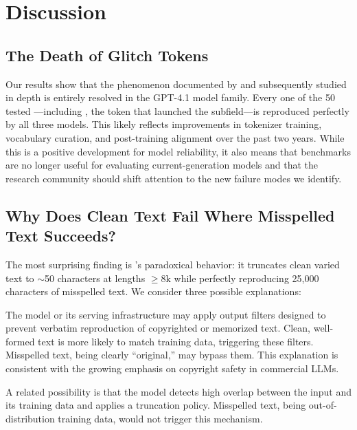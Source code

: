 \section{Discussion}
\label{sec:discussion}

\subsection{The Death of Glitch Tokens}

Our results show that the \glitchtoken phenomenon documented by \citet{rumbelow2023solidgoldmagikarp} and subsequently studied in depth \citep{land2024fishing, li2024glitch, zhang2024glitchprober, wu2024glitchminer} is entirely resolved in the GPT-4.1 model family. Every one of the 50 tested \glitchtokens---including \magikarp, the token that launched the subfield---is reproduced perfectly by all three models. This likely reflects improvements in tokenizer training, vocabulary curation, and post-training alignment over the past two years. While this is a positive development for model reliability, it also means that \glitchtoken benchmarks are no longer useful for evaluating current-generation models and that the research community should shift attention to the new failure modes we identify.

\subsection{Why Does Clean Text Fail Where Misspelled Text Succeeds?}

The most surprising finding is \gptfull's paradoxical behavior: it truncates clean varied text to $\sim$50 characters at lengths $\geq$8k while perfectly reproducing 25,000 characters of misspelled text. We consider three possible explanations:

The model or its serving infrastructure may apply output filters designed to prevent verbatim reproduction of copyrighted or memorized text. Clean, well-formed text is more likely to match training data, triggering these filters. Misspelled text, being clearly ``original,'' may bypass them. This explanation is consistent with the growing emphasis on copyright safety in commercial LLMs.

A related possibility is that the model detects high overlap between the input and its training data and applies a truncation policy. Misspelled text, being out-of-distribution \wrt training data, would not trigger this mechanism.

